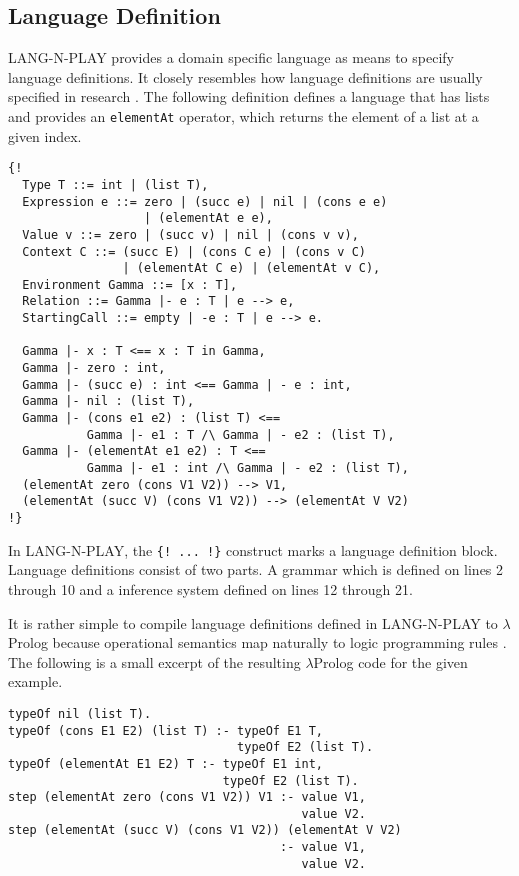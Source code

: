 \subsection{Language Definition}
LANG-N-PLAY provides a domain specific language as means to specify language definitions. It closely resembles how language definitions are usually specified in research \cite{cimini_effectiveness_2020}. The following definition defines a language that has lists and provides an \lstinline{elementAt} operator, which returns the element of a list at a given index.

\begin{lstlisting}
{!
  Type T ::= int | (list T),
  Expression e ::= zero | (succ e) | nil | (cons e e)
                   | (elementAt e e),
  Value v ::= zero | (succ v) | nil | (cons v v),
  Context C ::= (succ E) | (cons C e) | (cons v C)
                | (elementAt C e) | (elementAt v C),
  Environment Gamma ::= [x : T],
  Relation ::= Gamma |- e : T | e --> e,
  StartingCall ::= empty | -e : T | e --> e.

  Gamma |- x : T <== x : T in Gamma,
  Gamma |- zero : int,
  Gamma |- (succ e) : int <== Gamma | - e : int,
  Gamma |- nil : (list T),
  Gamma |- (cons e1 e2) : (list T) <==
           Gamma |- e1 : T /\ Gamma | - e2 : (list T),
  Gamma |- (elementAt e1 e2) : T <==
           Gamma |- e1 : int /\ Gamma | - e2 : (list T),
  (elementAt zero (cons V1 V2)) --> V1,
  (elementAt (succ V) (cons V1 V2)) --> (elementAt V V2)
!}
\end{lstlisting}

In LANG-N-PLAY, the \lstinline|{! ... !}| construct marks a language definition block. Language definitions consist of two parts. A grammar which is defined on lines 2 through 10 and a inference system defined on lines 12 through 21.

It is rather simple to compile language definitions defined in LANG-N-PLAY to $\lambda$Prolog because operational semantics map naturally to logic programming rules \cite{cimini_effectiveness_2020}. The following is a small excerpt of the resulting $\lambda$Prolog code for the given example.

\begin{lstlisting}
typeOf nil (list T).
typeOf (cons E1 E2) (list T) :- typeOf E1 T,
                                typeOf E2 (list T).
typeOf (elementAt E1 E2) T :- typeOf E1 int,
                              typeOf E2 (list T).
step (elementAt zero (cons V1 V2)) V1 :- value V1, 
                                         value V2.
step (elementAt (succ V) (cons V1 V2)) (elementAt V V2)
                                      :- value V1, 
                                         value V2.
\end{lstlisting}

